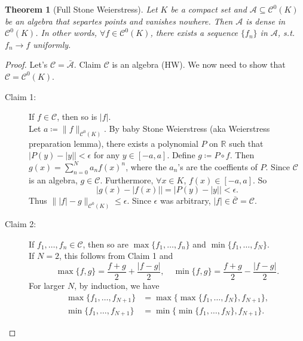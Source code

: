 \documentclass[12pt]{article}
\theoremstyle{plain}
\newtheorem{thm}{Theorem}
\theoremstyle{definition}
\begin{document}
\begin{thm}[Full Stone Weierstress]
    Let $K$ be a compact set and $\mathcal{A}\subseteq\mathcal{C}^0(K)$ be an
    algebra that separtes points and vanishes nowhere.
    Then $\mathcal{A}$ is dense in $\mathcal{C}^0(K)$.
    In other words, $\forall f\in\mathcal{C}^0(K)$, there exists a sequence
    $\{f_n\}$ in $\mathcal{A}$, s.t. $f_n\rightarrow f$ uniformly.
\end{thm}
\begin{proof}
    Let's $\mathcal{C}=\bar{\mathcal{A}}$.
    Claim $\mathcal{C}$ is an algebra (HW).
    We now need to show that $\mathcal{C}=\mathcal{C}^0(K)$.
    \begin{description}
        \item[Claim 1:] If $f\in\mathcal{C}$, then so is $|f|$.\\
        Let $a\coloneqq\|f\|_{\mathcal{C}^0(K)}$.
        By baby Stone Weierstress (aka Weierstress preparation lemma), there
        exists a polynomial $P$ on $\mathbb{R}$ such that
        $|P(y)-|y||<\epsilon$ for any $y\in[-a,a]$.
        Define $g\coloneqq P\circ f$.
        Then $g(x)=\sum_{n=0}^N a_nf(x)^n$, where the $a_n$'s are the coeffients of
        $P$.
        Since $\mathcal{C}$ is an algebra, $g\in\mathcal{C}$.
        Furthermore, $\forall x\in K$, $f(x)\in[-a,a]$.
        So
        $$|g(x)-|f(x)||=|P(y)-|y||<\epsilon.$$
        Thus $\||f|-g\|_{\mathcal{C}^0(K)}\leq\epsilon$.
        Since $\epsilon$ was arbitrary, $|f|\in\bar{\mathcal{C}}=\mathcal{C}$.

        \item[Claim 2:] If $f_1,\ldots,f_n\in\mathcal{C}$, then so are
        $\max\{f_1,\ldots,f_n\}$ and $\min\{f_1,\ldots,f_N\}$.\\
        If $N=2$, this follows from Claim 1 and
        $$\max\{f,g\}=\frac{f+g}{2}+\frac{|f-g|}{2},\quad
        \min\{f,g\}=\frac{f+g}{2}-\frac{|f-g|}{2}.$$
        For larger $N$, by induction, we have
        $$\begin{aligned}
            \max\{f_1,\ldots,f_{N+1}\}&=\max\{\max\{f_1,\ldots,f_N\},f_{N+1}\},\\
            \min\{f_1,\ldots,f_{N+1}\}&=\min\{\min\{f_1,\ldots,f_N\},f_{N+1}\}.
        \end{aligned}$$


\end{description}
\end{proof}
\end{document}
